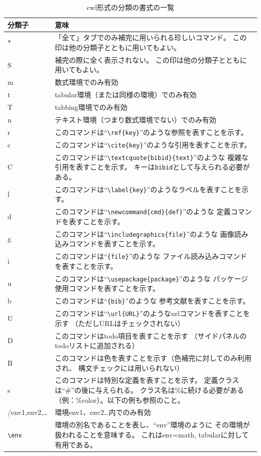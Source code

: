 \begin{table}[H]
  \centering
  \caption{cwl形式の分類の書式の一覧}
  \begin{tabularx}{\linewidth}{lX}
    \hline
    \textbf{分類子} & \textbf{意味}\\
    \hline
    * & 「全て」タブでのみ補完に用いられる珍しいコマンド。
      この印は他の分類子とともに用いてもよい。\\
    S & 補完の際に全く表示されない。 この印は他の分類子とともに用いてもよい。\\
    m & 数式環境でのみ有効\\
    t & tabular環境（または同様の環境）でのみ有効\\
    T & tabbing環境でのみ有効\\
    n & テキスト環境（つまり数式環境でない）でのみ有効\\
    r & このコマンドは``\verb+\ref+\verb+{key}+''のような参照を表すことを示す。\\
    c & このコマンドは``\verb+\cite+\verb+{key}+''のような引用を表すことを示す。\\
    C & このコマンドは``\verb+\textcquote+\verb+{bibid}{text}+''のような
      複雑な引用を表すことを示す。
      キーは\verb+bibid+として与えられる必要がある。\\
    l & このコマンドは``\verb+\label+\verb+{key}+''のようなラベルを表すことを示す。\\
    d & このコマンドは``\verb+\newcommand+\verb+{cmd}{def}+''のような
      定義コマンドを表すことを示す。\\
    g & このコマンドは``\verb+\includegraphics+\verb+{file}+''のような
      画像読み込みコマンドを表すことを示す。\\
    i & このコマンドは``\verb++\verb+{file}+''のような
      ファイル読み込みコマンドを表すことを示す。\\
    u & このコマンドは``\verb+\usepackage+\verb+{package}+''のような
      パッケージ使用コマンドを表すことを示す。\\
    b & このコマンドは``\verb++\verb+{bib}+''のような
      参考文献を表すことを示す。\\
    U & このコマンドは``\verb+\url+\verb+{URL}+''のようなurlコマンドを表すことを示す
      （ただしURLはチェックされない）\\
    D & このコマンドはtodo項目を表すことを示す
      （サイドパネルのtodoリストに追加される）\\
    B & このコマンドは色を表すことを示す（色補完に対してのみ利用され、
       構文チェックには用いられない）\\
    s & このコマンドは特別な定義を表すことを示す。
       定義クラスは``\#''の後に与えられる。
       クラス名は\%に続ける必要がある（例：\%color）。以下の例も参照のこと。\\
    /env1,env2,\ldots{} & 環境env1、env2\ldots{}内でのみ有効\\
    \verb+\env+ & 環境の別名であることを表し、``env''環境のように
      その環境が扱われることを意味する。
      これはenv=math, tabularに対して有用である。\\
    \hline
  \end{tabularx}
\end{table}

